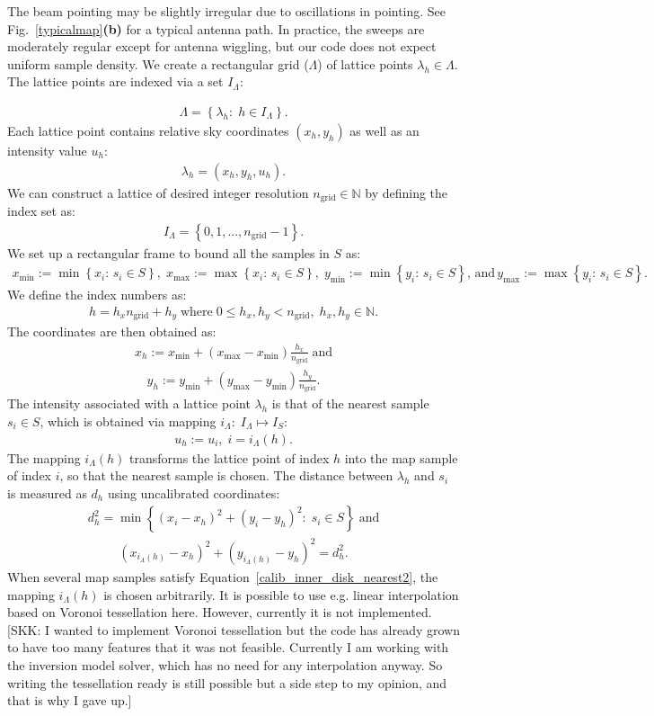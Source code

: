 \documentclass{aa}
\newcommand{\skk}[1]{\textcolor{midorange}{[SKK: #1]}} %
\newcommand{\eqnl}[2]{\begin{eqnarray}\label{#1}#2\end{eqnarray}}
\renewcommand{\min}[1]{\operatorname{min} \left\{ #1 \right\}}
\renewcommand{\max}[1]{\operatorname{max} \left\{ #1 \right\}}
\newcommand{\s}[2]{{#1}_{\mathrm{#2}}}
\begin{document}
  The beam pointing may be slightly 
  irregular due to oscillations in pointing. See Fig.~\ref{typicalmap}{\bf(b)} for a typical antenna path. In 
  practice, the sweeps are moderately regular except for antenna wiggling, but our code does not expect uniform sample 
  density. We create a rectangular grid ($\Lambda$) of lattice points $\lambda_h \in \Lambda$. The lattice points are indexed via a set $I_{\Lambda}$:
  
  \eqnl{calib_inner_disk_lattice}{
  \Lambda = \left\{ \lambda_h :\; h \in I_{\Lambda} \right\} \text{.}
  }
  Each lattice point contains relative sky coordinates $\left( x_h, y_h \right)$ as well as an intensity value $u_h$:
  \eqnl{calib_inner_disk_point}{
  \lambda_h = \left( x_h, y_h, u_h \right) \text{.}
  }
  We can construct a lattice of desired integer resolution $\s{n}{grid} \in \mathds{N}$ by defining the index set as:
  \eqnl{calib_inner_disk_index}{
  I_{\Lambda} = \left\{ 0, 1, ..., \s{n}{grid}-1 \right\} \text{.}
  }
  We set up a rectangular frame to bound all the samples in $S$ as:
  \eqnl{calib_inner_disk_frame}{
  \s{x}{min} := \min{x_i:\, s_i \in S}, \; \s{x}{max} := \max{x_i:\, s_i \in S}, \; \s{y}{min} := \min{y_i:\, s_i \in S} \text{, and} \, \s{y}{max} := \max{y_i:\, s_i \in S} \text{.}
  }
  We define the index numbers as:
  \eqnl{calib_inner_disk_elem}{
  h = h_x \s{n}{grid} + h_y \; \text{where} \; 0 \le h_x,h_y < \s{n}{grid}, \; h_x,h_y \in \mathds{N} \text{.}
  }
  The coordinates are then obtained as:
  \eqnl{calib_inner_disk_lattice_x}{
  x_h := \s{x}{min} + \left( \s{x}{max} - \s{x}{min} \right) \frac{h_x}{\s{n}{grid}} \; \text{and}
  }
  \eqnl{calib_inner_disk_lattice_y}{
  y_h := \s{y}{min} + \left( \s{y}{max} - \s{y}{min} \right) \frac{h_y}{\s{n}{grid}} \text{.}
  }
  The intensity associated with a lattice point $\lambda_h$ is that of the nearest sample $s_i \in S$, which is obtained via mapping $i_{\Lambda}:\; I_{\Lambda} \mapsto I_S$:
  \eqnl{calib_inner_disk_lattice_u}{
  u_h := u_i, \; i = i_{\Lambda}(h) \text{.}
  }
  The mapping $i_{\Lambda}(h)$ transforms the lattice point of index $h$ into the map sample of index $i$, so that the nearest sample is chosen. The distance between $\lambda_h$ and $s_i$ is measured as $d_h$ using uncalibrated coordinates:
  \eqnl{calib_inner_disk_nearest1}{
  d_h^2 = \min{\left( x_i - x_h \right)^2 + \left( y_i - y_h \right)^2:\; s_i \in S} \; \text{and}
  }
  \eqnl{calib_inner_disk_nearest2}{
  \left( x_{i_{\Lambda}(h)} - x_h \right)^2 + \left( y_{i_{\Lambda}(h)} - y_h \right)^2 = d_h^2 \text{.}
  }
   When several map samples satisfy Equation~\ref{calib_inner_disk_nearest2}, the mapping $i_{\Lambda}(h)$ is chosen 
  arbitrarily. It is possible to use e.g. linear interpolation based on Voronoi tessellation here. However, currently it 
  is not implemented. \skk{I wanted to implement Voronoi tessellation but the code has already grown to have too many 
  features that it was not feasible. Currently I am working with the inversion model solver, which has no need for any 
  interpolation anyway. So writing the tessellation ready is still possible but a side step to my opinion, and that is 
  why I gave up.}
 
\end{document}
